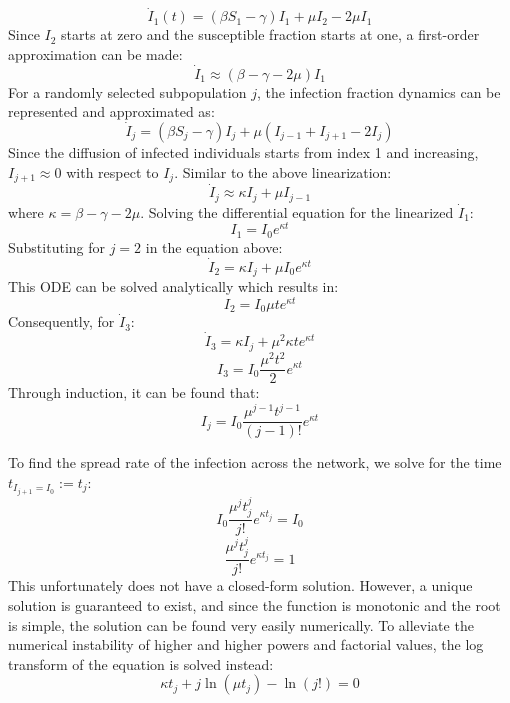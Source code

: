 \begin{equation}
\dot I_1(t)=(\beta S_1-\gamma)I_1+\mu I_2-2\mu I_1
\end{equation}
Since $I_2$ starts at zero and the susceptible fraction starts at one, a first-order approximation can be made:
\begin{equation}
\dot I_1 \approx (\beta-\gamma-2\mu)I_1
\end{equation}
For a randomly selected subpopulation $j$, the infection fraction dynamics can be represented and approximated as:
\begin{equation}
\dot I_j =(\beta S_j-\gamma)I_j+\mu (I_{j-1}+I_{j+1}-2 I_j)
\end{equation}
Since the diffusion of infected individuals starts from index 1 and increasing, $I_{j+1} \approx 0$ with respect to $I_j$. Similar to the above linearization:
\begin{equation}
\dot I_j \approx \kappa I_j+\mu I_{j-1}
\label{eq: kappa}
\end{equation}
where $\kappa = \beta-\gamma-2\mu$. Solving the differential equation for the linearized $\dot I_1$:
\begin{equation}
I_1 = I_0 e^{\kappa t}
\end{equation}
Substituting for $j=2$ in the equation above:
\begin{equation}
\dot I_2=\kappa I_j +\mu I_0 e^{\kappa t}
\end{equation}
This ODE can be solved analytically which results in:
\begin{equation}
I_2=I_0 \mu t e^{\kappa t}  
\end{equation}
Consequently, for $\dot I_3$:
\begin{equation}
\dot I_3=\kappa I_j +\mu^2 \kappa t e^{\kappa t}
\end{equation}
\begin{equation}
I_3 = I_0 \frac{\mu^2 t^2}{2} e^{\kappa t}
\end{equation}
Through induction, it can be found that:
\begin{equation}
I_j=I_0 \frac{\mu^{j-1} t^{j-1}}{(j-1)!} e^{\kappa t}
\end{equation}

To find the spread rate of the infection across the network, we solve for the time $t_{I_{j+1}=I_0} :=t_j$:
\begin{equation}
I_0 \frac{\mu^{j} t_j^{j}}{j!} e^{\kappa t_j} = I_0
\end{equation}
\begin{equation}
\frac{\mu^{j} t_j^{j}}{j!} e^{\kappa t_j} = 1 
\end{equation}
This unfortunately does not have a closed-form solution. However, a unique solution is guaranteed to exist, and since the function is monotonic and the root is simple, the solution can be found very easily numerically. To alleviate the numerical instability of higher and higher powers and factorial values, the log transform of the equation is solved instead:
\begin{equation}
\kappa t_j + j \ln(\mu t_j) - \ln(j!) = 0
\end{equation}

